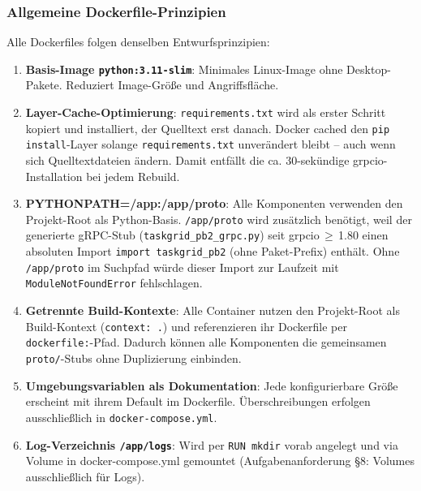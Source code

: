 \subsubsection*{Allgemeine Dockerfile-Prinzipien}

Alle Dockerfiles folgen denselben Entwurfsprinzipien:

\begin{enumerate}
  \item \textbf{Basis-Image \texttt{python:3.11-slim}}: Minimales Linux-Image
        ohne Desktop-Pakete. Reduziert Image-Größe und Angriffsfläche.

  \item \textbf{Layer-Cache-Optimierung}: \texttt{requirements.txt} wird als
        erster Schritt kopiert und installiert, der Quelltext erst danach.
        Docker cached den \texttt{pip install}-Layer solange
        \texttt{requirements.txt} unverändert bleibt -- auch wenn sich
        Quelltextdateien ändern. Damit entfällt die ca. 30-sekündige
        grpcio-Installation bei jedem Rebuild.

  \item \textbf{PYTHONPATH=/app:/app/proto}: Alle Komponenten verwenden den
        Projekt-Root als Python-Basis. \texttt{/app/proto} wird zusätzlich
        benötigt, weil der generierte gRPC-Stub
        (\texttt{taskgrid\_pb2\_grpc.py}) seit grpcio\,$\geq$\,1.80 einen
        absoluten Import \texttt{import taskgrid\_pb2} (ohne Paket-Prefix)
        enthält. Ohne \texttt{/app/proto} im Suchpfad würde dieser Import
        zur Laufzeit mit \texttt{ModuleNotFoundError} fehlschlagen.

  \item \textbf{Getrennte Build-Kontexte}: Alle Container nutzen den
        Projekt-Root als Build-Kontext (\texttt{context: .}) und referenzieren
        ihr Dockerfile per \texttt{dockerfile:}-Pfad. Dadurch können alle
        Komponenten die gemeinsamen \texttt{proto/}-Stubs ohne Duplizierung
        einbinden.

  \item \textbf{Umgebungsvariablen als Dokumentation}: Jede konfigurierbare
        Größe erscheint mit ihrem Default im Dockerfile. Überschreibungen
        erfolgen ausschließlich in \texttt{docker-compose.yml}.

  \item \textbf{Log-Verzeichnis \texttt{/app/logs}}: Wird per \texttt{RUN mkdir}
        vorab angelegt und via Volume in docker-compose.yml gemountet
        (Aufgabenanforderung §8: Volumes ausschließlich für Logs).
\end{enumerate}

